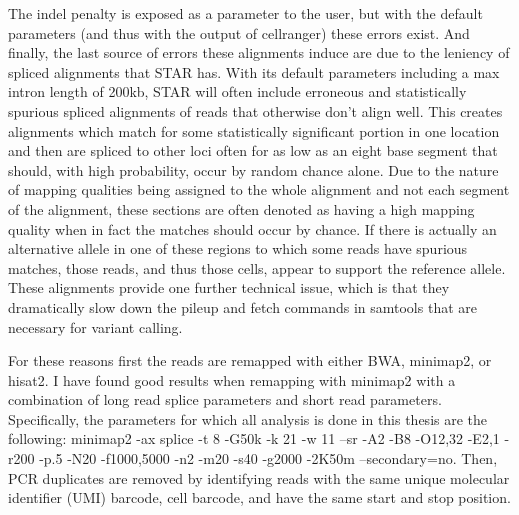 \par{
The indel penalty is exposed as a parameter to the user, but with the default parameters (and thus with the output of cellranger) these errors exist. 
And finally, the last source of errors these alignments induce are due to the leniency of spliced alignments that STAR has. With its default parameters including 
a max intron length of 200kb, STAR will often include erroneous and statistically spurious spliced alignments of reads that otherwise don't align well. This creates alignments 
which match for some statistically significant portion in one location and then are spliced to other loci often for as low as an eight base segment that should, with high probability, occur by 
random chance alone. Due to the nature of mapping qualities being assigned to the whole alignment and not each segment of the alignment, these sections are often denoted as 
having a high mapping quality when in fact the matches should occur by chance. If there is actually an alternative allele in one of these regions to which some reads have 
spurious matches, those reads, and thus those cells, appear to support the reference allele. These alignments provide one further technical 
issue, which is that they dramatically slow down the pileup and fetch commands in samtools\cite{samtools} that are necessary for variant calling. 
} 
\par{
For these reasons first the reads are remapped with either BWA, minimap2, or hisat2. I have found good results when remapping with minimap2 with a combination 
of long read splice parameters and short read parameters. Specifically, the parameters for which all analysis is done in this thesis are the following: 
minimap2 -ax splice -t 8 -G50k -k 21 -w 11 --sr -A2 -B8 -O12,32 -E2,1 -r200 -p.5 -N20 -f1000,5000 -n2 -m20 -s40 -g2000 -2K50m --secondary=no. Then, PCR duplicates are removed by identifying reads with the same unique molecular identifier (UMI) barcode, cell barcode, and have the same start and stop position.
}


